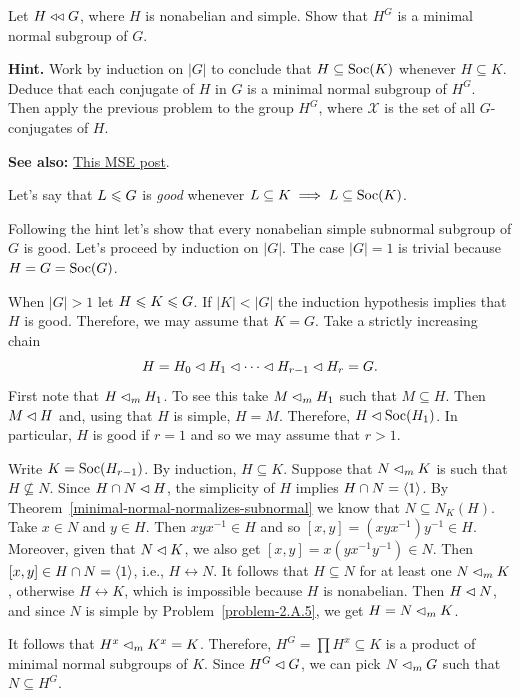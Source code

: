\begin{probl}
    Let\/ $H\mathrel{\triangleleft\triangleleft} G$, where\/ $H$ is nonabelian and simple. Show that\/ $H^G$ is a minimal normal subgroup of\/ $G$.

    \textrm{\upshape\textbf{Hint.} Work by induction on $|G|$ to conclude that $H\subseteq {\rm Soc}(K)$ whenever $H\subseteq K$. Deduce that each conjugate of $H$ in $G$ is a minimal normal subgroup of $H^G$. Then apply the previous problem to the group $H^G$, where $\mathcal X$ is the set of all $G$-conjugates of $H$.}

    \textrm{\upshape\textbf{See also:} \href{https://math.stackexchange.com/a/2368182/269050}{This MSE post}}.
\end{probl}

\begin{solution} Let's say that $L\leqslant G$ is \textsl{good} whenever $L\subseteq K\implies L\subseteq{\rm Soc}(K)$. 

Following the hint let's show that every nonabelian simple subnormal subgroup of $G$ is good. Let's proceed by induction on $|G|$. The case $|G|=1$ is trivial because $H=G={\rm Soc}(G)$.

When $|G|>1$ let $H\leqslant K\leqslant G$. If $|K|<|G|$ the induction hypothesis implies that $H$ is good. Therefore, we may assume that $K=G$. Take a strictly increasing chain
$$
    H = H_0\lhd H_1\lhd\cdots\lhd H_{r-1}\lhd H_r=G.
$$
First note that $H\lhd_mH_1$. To see this take $M\lhd_mH_1$ such that $M\subseteq H$. Then $M\lhd H$ and, using that $H$ is simple, $H=M$. Therefore, $H\lhd{\rm Soc}(H_1)$. In particular, $H$ is good if $r=1$ and so we may assume that $r>1$.

Write $K={\rm Soc}(H_{r-1})$. By induction, $H\subseteq K$. Suppose that $N\lhd_m K$ is such that $H\not\subseteq N$. Since $H\cap N\lhd H$, the simplicity of $H$ implies $H\cap N=\langle1\rangle$. By Theorem~\ref{minimal-normal-normalizes-subnormal} we know that $N\subseteq N_K(H)$. Take $x\in N$ and $y\in H$. Then $xyx^{-1}\in H$ and so $[x,y]=(xyx^{-1})y^{-1}\in H$. Moreover, given that $N\lhd K$, we also get $[x,y]=x(yx^{-1}y^{-1})\in N$. Then $[x,y]\in H\cap N=\langle1\rangle$, i.e., $H\leftrightarrow N$. It follows that $H\subseteq N$ for at least one $N\lhd_mK$, otherwise $H\leftrightarrow K$, which is impossible because $H$ is nonabelian. Then $H\lhd N$, and since $N$ is simple by Problem~\ref{problem-2.A.5}, we get $H=N\lhd_mK$.

It follows that $H^x\lhd_mK^x=K$. Therefore, $H^G=\prod H^x\subseteq K$ is a product of minimal normal subgroups of $K$. Since $H^G\lhd G$, we can pick $N\lhd_mG$ such that $N\subseteq H^G$.


\end{solution}
